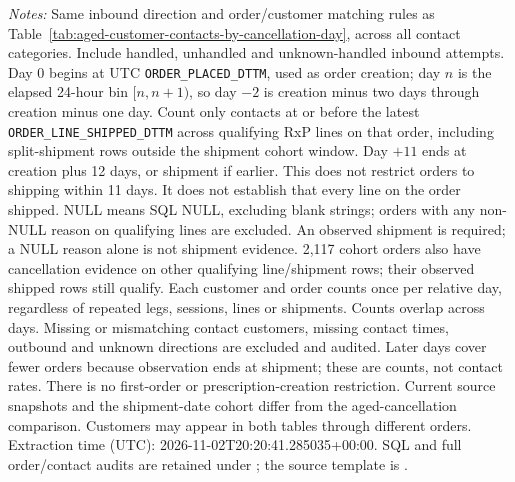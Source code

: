 \begin{table}[!htbp]
\begin{minipage}{\linewidth}
\footnotesize
\textit{Notes:} Same inbound direction and order/customer matching rules as
Table~\ref{tab:aged-customer-contacts-by-cancellation-day}, across all contact
categories. Include handled, unhandled and unknown-handled inbound attempts.
Day 0 begins at UTC \texttt{ORDER\_PLACED\_DTTM}, used as order creation;
day $n$ is the elapsed 24-hour bin $[n,n+1)$, so day $-2$ is creation minus
two days through creation minus one day. Count only contacts at or before
the latest \texttt{ORDER\_LINE\_SHIPPED\_DTTM} across qualifying RxP lines
on that order, including split-shipment rows outside the shipment cohort window.
Day $+11$ ends at creation plus 12 days, or shipment if earlier. This does not
restrict orders to shipping within 11 days. It does not establish that every
line on the order shipped. NULL means SQL NULL, excluding blank strings;
orders with any non-NULL reason on qualifying lines are excluded.
An observed shipment is required; a NULL reason alone is not shipment evidence.
2,117 cohort orders also have cancellation evidence on
other qualifying line/shipment rows; their observed shipped rows still qualify.
Each customer and order counts once per relative day, regardless of repeated
legs, sessions, lines or shipments. Counts overlap across days. Missing or
mismatching contact customers, missing contact times, outbound and unknown
directions are excluded and audited. Later days cover fewer orders because
observation ends at shipment; these are counts, not contact rates. There is
no first-order or prescription-creation restriction. Current source snapshots
and the shipment-date cohort differ from the aged-cancellation comparison.
Customers may appear in both tables through different orders.
Extraction time (UTC): 2026-11-02T20:20:41.285035+00:00.
SQL and full order/contact audits are retained under
;
the source template is .
\end{minipage}
\end{table}
